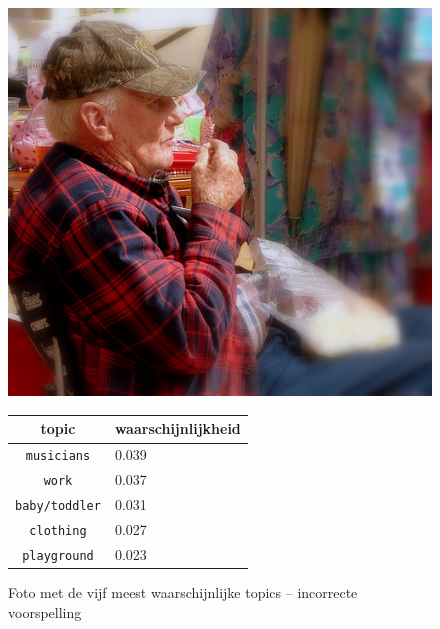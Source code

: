 \begin{figure}[h]
    \centering
    \begin{minipage}[t]{.5\linewidth}
    \centering
    \vspace{0pt}
    \includegraphics[width=\textwidth]{Images/LDA/3867804763.jpg}
    \end{minipage}\hfill
    \begin{minipage}[t]{.5\textwidth}
    \centering
    \vspace{0pt}
    \begin{tabular}{cl}
            topic                           & waarschijnlijkheid\\
            \hline
            \texttt{musicians}             & 0.039 \\
            \texttt{work}                   & 0.037 \\
            \texttt{baby/toddler}                 & 0.031 \\
            \texttt{clothing}           & 0.027 \\
            \texttt{playground}        & 0.023\\
            \hline
        \end{tabular}
    \end{minipage}
    \caption{Foto met de vijf meest waarschijnlijke topics -- incorrecte voorspelling}
    \label{fig:wrongldalearning}
\end{figure}


